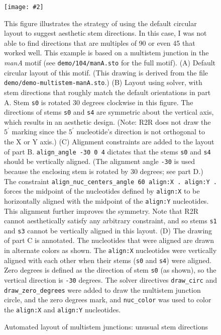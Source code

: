 \documentclass[letterpaper,12pt]{report}
\newcommand{\fig}[4]{
\begin{figure}
\texttt{[image: \#2]}
\caption{#3}

\begin{small}
#4
\end{small}
\label{#1}
\end{figure}
}
\begin{document}
\fig{fig:multistemsolvermanA}{figures/multistem-solver-manA.pdf}{Automated layout of multistem junctions: unusual stem directions}{
This figure illustrates the strategy of using the default circular layout to suggest aesthetic stem directions.
In this case, I was not able to find directions that are multiples of 90 or even 45 that worked well.
This example is based on a multistem junction in the {\it manA} motif \cite{Weinberg104Motifs} (see {\tt demo/104/manA.sto} for the full motif).
(A)
Default circular layout of this motif.
(This drawing is derived from the file
{\tt demo/demo-multistem-manA.sto}.)
(B)
Layout using solver, with stem directions that roughly match the default orientations in part A.  Stem {\tt s0} is rotated 30 degrees clockwise in this figure.
The directions of stems {\tt s0} and {\tt s4} are symmetric about the vertical axis, which results in
an aesthetic design.
(Note: R2R does not draw the $5^\prime$ marking since the $5^\prime$ nucleotide's direction is not orthogonal to the X or Y axis.)
(C)
Alignment constraints are added to the layout of part B.
{\tt align\_angle -30 0 4} dictates that the stems {\tt s0} and {\tt s4} should be vertically
aligned. (The alignment angle {\tt -30} is used because the enclosing stem is
rotated by 30 degrees; see part D.)
The constraint {\tt align\_nuc\_centers\_angle 60 align:X . align:Y .} forces
the midpoint of the nucleotides defined by {\tt align:X} to be horizontally
aligned with the midpoint of the {\tt align:Y} nucleotides.
This alignment further improves the symmetry.
Note that R2R cannot aesthetically satisfy any arbitrary constraint,
and so stems {\tt s1} and {\tt s3} cannot be vertically aligned in this layout.
(D)
The drawing of part C is annotated.  The nucleotides that were aligned are drawn in
alternate colors as shown.  The {\tt align:X} nucleotides were vertically aligned
with each other when their stems ({\tt s0} and {\tt s4}) were aligned.
Zero degrees is defined as the direction of stem {\tt s0} (as shown), so the
vertical direction is {\tt -30} degrees.
The solver directives {\tt draw\_circ}
and {\tt draw\_zero\_degrees} were added to draw the multistem junction circle,
and the zero degrees mark, and {\tt nuc\_color} was used to color
the {\tt align:X} and {\tt align:Y} nucleotides.
}
\end{document}
